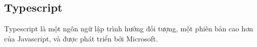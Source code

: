 \documentclass[./../main.tex]{subfiles}
\begin{document}








\hypertarget{typescript}{%
\subsection{Typescript}\label{typescript}}

Typescript là một ngôn ngữ lập trình hướng đối tượng, một phiên bản cao hơn của Javascript, và được phát triển bởi Microsoft.
\end{document}
